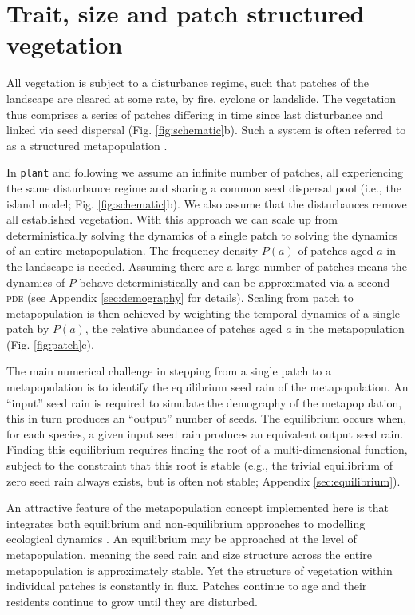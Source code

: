 \documentclass[a4paper,11pt]{article}
\newcommand{\plant}{\texttt{plant}}
\begin{document}
\section{Trait, size and patch structured vegetation}

All vegetation is subject to a disturbance regime, such that patches
of the landscape are cleared at some rate, by fire, cyclone or
landslide.  The vegetation thus comprises a series of patches
differing in time since last disturbance and linked via seed dispersal
(Fig.  \ref{fig:schematic}b). Such a system is often referred to as a
structured metapopulation \citep{Gyllenberg-2001}.

In {\plant} and following \citep{Kohyama-1993, Moorcroft-2001,
  Falster-2011} we assume an infinite number of patches, all experiencing
the same disturbance regime and sharing a common seed dispersal pool
(i.e., the island model; Fig. \ref{fig:schematic}b). We also assume
that the disturbances remove all established vegetation.  With this
approach we can scale up from deterministically solving the dynamics of
a single patch to solving the dynamics of an entire metapopulation.
The frequency-density \(P(a)\) of patches aged
\(a\) in the landscape is needed. Assuming there are a large number of
patches means the dynamics of \(P\) behave deterministically and can
be approximated via a second \textsc{pde} (see Appendix
\ref{sec:demography} for details). Scaling from patch to
metapopulation is then achieved by weighting the temporal dynamics of
a single patch by \(P(a)\), the relative abundance of patches aged
\(a\) in the metapopulation (Fig. \ref{fig:patch}c).

The main numerical challenge in stepping from a single patch to a
metapopulation is to identify the equilibrium seed rain of the
metapopulation. An ``input'' seed rain is required to simulate the
demography of the metapopulation, this in turn produces an ``output''
number of seeds. The equilibrium occurs when, for each species,
a given input seed rain
produces an equivalent output seed rain. Finding this equilibrium
requires finding the root of a multi-dimensional function, subject to
the constraint that this root is stable (e.g., the trivial equilibrium
of zero seed rain always exists, but is often not stable; Appendix
\ref{sec:equilibrium}).

An attractive feature of the metapopulation concept implemented here
is that integrates both equilibrium and non-equilibrium approaches to
modelling ecological dynamics \citep{Kohyama-1993, Moorcroft-2001,
  Falster-2011}. An equilibrium may be approached at the level of
metapopulation, meaning the seed rain and size structure across the
entire metapopulation is approximately stable. Yet the structure of
vegetation within individual patches is constantly in flux. Patches
continue to age and their residents continue to grow until they are
disturbed.
\end{document}
